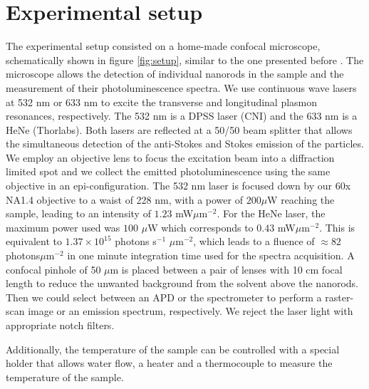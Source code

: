 \documentclass[journal=nalefd,manuscript=letter]{achemso}
\begin{document}
\section{Experimental setup}\label{sec:setup}

The experimental setup consisted on a home-made confocal microscope, schematically shown in figure
\ref{fig:setup}, similar to the one presented before \cite{Carattino2016a}. The microscope allows 
the detection of individual nanorods in the sample and the measurement of their photoluminescence spectra. 
We use continuous wave lasers at 532 nm or 633 nm to excite the transverse and longitudinal plasmon resonances, respectively. The  532 nm is a DPSS laser (CNI) and the 633 nm is a HeNe (Thorlabs). Both lasers are reflected at a 50/50 beam splitter that allows the simultaneous detection of the anti-Stokes and Stokes emission of the particles.
We employ an objective lens to focus the excitation beam into a diffraction 
limited spot and we collect the emitted photoluminescence using the same objective in an epi-configuration. 
The 532 nm laser is focused down by our 60x NA1.4 objective to a waist of 228 nm, with a power of $200 \mu$W reaching the sample, leading to an intensity of $1.23$ mW$\mu$m$^{-2}$. 
For the HeNe laser, the maximum power used was $100$ $\mu$W which 
corresponds to $0.43$ mW$\mu$m$^{-2}$. This is equivalent to $1.37\times10^{15}$ photons s$^{-1}$ $\mu$m$^{-2}$, which leads to a fluence of $\approx 82$ photons$\mu$m$^{-2}$ in one minute integration time used for the spectra acquisition. 
A confocal pinhole of 50 $\mu$m is placed between a pair of lenses with 10 cm focal length to reduce the unwanted background from the solvent above the nanorods. Then we could select between an APD or the spectrometer to perform a raster-scan image or an emission spectrum, respectively. We reject the laser light with appropriate notch filters.

Additionally, the temperature of the sample can be controlled with a special holder that allows 
water flow, a heater and a thermocouple to measure the temperature of the sample. 
\end{document}
